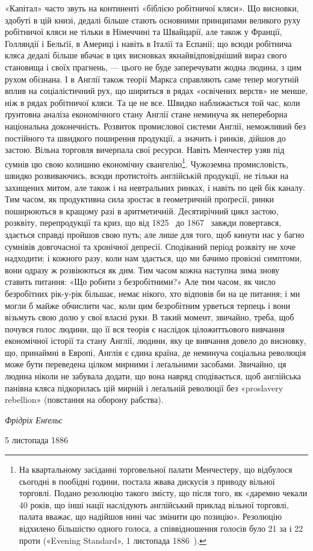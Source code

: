 «Капітал» часто звуть на континенті «біблією робітничої
кляси». Що висновки, здобуті в цій книзі, дедалі більше стають
основними принципами великого руху робітничої кляси не тільки
в Німеччині та Швайцарії, але також у Франції, Голляндії і
Бельґії, в Америці і навіть в Італії та Еспанії; що всюди робітнича
кляса дедалі більше вбачає в цих висновках якнайвідповідніший
вираз свого становища і своїх прагнень, — цього не буде
заперечувати жодна людина, з цим рухом обізнана. І в Англії також
теорії Маркса справляють саме тепер могутній вплив на соціалістичний
рух, що шириться в рядах «освічених верств» не менше,
ніж в рядах робітничої кляси. Та це не все. Швидко наближається
той час, коли ґрунтовна аналіза економічного стану Англії стане
неминуча як непереборна національна доконечність. Розвиток
промислової системи Англії, неможливий без постійного та швидкого
поширення продукції, а значить і ринків, дійшов до застою.
Вільна торговля вичерпала свої ресурси. Навіть Менчестер узяв
під сумнів цю свою колишню економічну євангелію\footnote{
На квартальному засіданні торговельної палати Менчестеру, що
відбулося сьогодні в пообідні години, постала жвава дискусія з приводу
вільної торговлі. Подано резолюцію такого змісту, що після того, як
«даремно чекали 40 років, що інші нації наслідують англійський приклад
вільної торговлі, палата вважає, що надійшов нині час змінити цю позицію».
Резолюцію відхилено більшістю одного голоса, а співвідношення
голосів було 21 за і 22 проти («Evening Standard», 1 листопада 1886~).
}. Чужоземна
промисловість, швидко розвиваючись, всюди протистоїть англійській
продукції, не тільки на захищених митом, але також і на
невтральних ринках, і навіть по цей бік каналу. Тим часом, як
продуктивна сила зростає в геометричній проґресії, ринки поширюються
в кращому разі в аритметичній. Десятирічний цикл
застою, розквіту, перепродукції та криз, що від 1825~ до 1867~
завжди повертався, здається справді пройшов свою путь; але
лише для того, щоб кинути нас у багно сумнівів довгочасної та
хронічної депресії. Сподіваний період розквіту не хоче надходити;
і кожного разу, коли нам здається, що ми бачимо провісні
симптоми, вони одразу ж розвіюються як дим. Тим часом  кожна
наступна зима знову ставить питання: «Що робити з безробітними?»
Але тим часом, як число безробітних рік-у-рік більшає,
немає нікого, хто відповів би на це питання; і ми могли б майже
обчислити час, коли цим безробітним урветься терпець і вони
візьмуть свою долю у свої власні руки. В такий момент, звичайно,
треба, щоб почувся голос людини, що її вся теорія є наслідок
ціложиттьового вивчання економічної історії та стану Англії,
людини, яку це вивчання довело до висновку, що, принаймні в
Европі, Англія є єдина країна, де неминуча соціальна революція
може бути переведена цілком мирними і леґальними засобами.
Звичайно, ця людина ніколи не забувала додати, що вона навряд
сподівається, щоб англійська панівна кляса підкорилась цій
мирній і леґальній революції без «proslavery rebellion» (повстання
на оборону рабства).

\begin{flushright}
\emph{Фрідріх Енґельс}
\end{flushright}

{\small 5 листопада 1886~}
